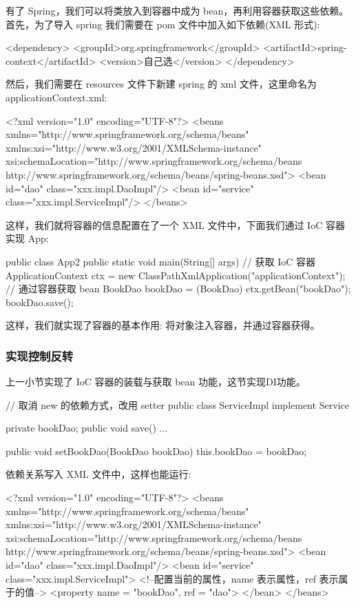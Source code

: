 有了 Spring，我们可以将类放入到容器中成为 bean，再利用容器获取这些依赖。首先，为了导入 spring 我们需要在 pom 文件中加入如下依赖(XML 形式):

\begin{xml}
<dependency>
    <groupId>org.springframework</groupId>
    <artifactId>spring-context</artifactId>
    <version>自己选</version>
</dependency>
\end{xml}

然后，我们需要在 resources 文件下新建 spring 的 xml 文件，这里命名为 applicationContext.xml:

\begin{xml}
<?xml version="1.0" encoding="UTF-8"?>
<beans xmlns="http://www.springframework.org/schema/beans"
       xmlns:xsi="http://www.w3.org/2001/XMLSchema-instance"
       xsi:schemaLocation="http://www.springframework.org/schema/beans http://www.springframework.org/schema/beans/spring-beans.xsd">
<bean id="dao" class="xxx.impl.DaoImpl"/>
<bean id="service" class="xxx.impl.ServiceImpl"/>
</beans>
\end{xml}

这样，我们就将容器的信息配置在了一个 XML 文件中，下面我们通过 IoC 容器实现 App:

\begin{Java}
public class App2 {
    public static void main(String[] args) {
        // 获取 IoC 容器
        ApplicationContext ctx = new ClassPathXmlApplication("applicationContext");
        // 通过容器获取 bean
        BookDao bookDao = (BookDao) ctx.getBean("bookDao");
        bookDao.save();
    }
}
\end{Java}

这样，我们就实现了容器的基本作用: 将对象注入容器，并通过容器获得。

\subsubsection{实现控制反转}

上一小节实现了 IoC 容器的装载与获取 bean 功能，这节实现DI功能。

\begin{Java}
// 取消 new 的依赖方式，改用 setter
public class ServiceImpl implement Service {
    private bookDao;
    public void save() { ... }

    public void setBookDao(BookDao bookDao) {
        this.bookDao = bookDao;
    }
}
\end{Java}

依赖关系写入 XML 文件中，这样也能运行:
\begin{xml}
<?xml version="1.0" encoding="UTF-8"?>
<beans xmlns="http://www.springframework.org/schema/beans"
       xmlns:xsi="http://www.w3.org/2001/XMLSchema-instance"
       xsi:schemaLocation="http://www.springframework.org/schema/beans http://www.springframework.org/schema/beans/spring-beans.xsd">
<bean id="dao" class="xxx.impl.DaoImpl"/>
<bean id="service" class="xxx.impl.ServiceImpl">
    <!--配置当前的属性，name 表示属性，ref 表示属于的值-->
    <property name = "bookDao", ref = "dao">
</bean>
</beans>
\end{xml}

\newpage